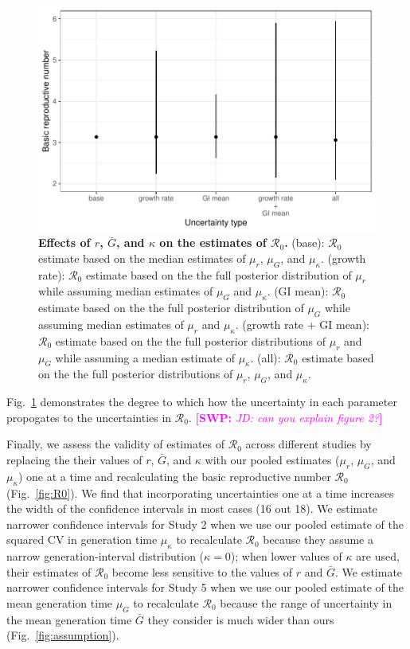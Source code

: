 \documentclass[12pt]{article}
\newcommand{\fref}[1]{Fig.~\ref{fig:#1}}
\newcommand{\comment}[3]{\textcolor{#1}{\textbf{[#2: }\textsl{#3}\textbf{]}}}
\newcommand{\swp}[1]{\comment{magenta}{SWP}{#1}}
\begin{document}
\begin{figure}[!ht]
\includegraphics[width=\textwidth]{figure2.pdf}
\caption{
\textbf{Effects of $r$, $\bar G$, and $\kappa$ on the estimates of $\mathcal R_0$.}
(base): $\mathcal R_0$ estimate based on the median estimates of $\mu_r$, $\mu_G$, and $\mu_\kappa$.
(growth rate): $\mathcal R_0$ estimate based on the the full posterior distribution of $\mu_r$ while assuming median estimates of $\mu_G$ and $\mu_\kappa$.
(GI mean): $\mathcal R_0$ estimate based on the the full posterior distribution of $\mu_G$ while assuming median estimates of $\mu_r$ and $\mu_\kappa$.
(growth rate + GI mean): $\mathcal R_0$ estimate based on the the full posterior distributions of $\mu_r$ and $\mu_G$ while assuming a median estimate of $\mu_\kappa$.
(all): $\mathcal R_0$ estimate based on the the full posterior distributions of  $\mu_r$, $\mu_G$, and $\mu_\kappa$.
}
\label{fig:eff}
\end{figure}

\fref{eff} demonstrates the degree to which how the uncertainty in each parameter propogates to the uncertainties in $\mathcal R_0$.
\swp{JD: can you explain figure 2?}

Finally, we assess the validity of estimates of $\mathcal R_0$ across different studies by 
replacing the their values of $r$, $\bar G$, and $\kappa$ with our pooled estimates ($\mu_r$, $\mu_G$, and $\mu_\kappa$) one at a time and recalculating the basic reproductive number $\mathcal R_0$ (\fref{R0}).
We find that incorporating uncertainties one at a time increases the width of the confidence intervals in most cases (16 out 18).
We estimate narrower confidence intervals for Study 2 when we use our pooled estimate of the squared CV in generation time $\mu_\kappa$ to recalculate $\mathcal R_0$ because they assume a narrow generation-interval distribution ($\kappa=0$);
when lower values of $\kappa$ are used, their estimates of $\mathcal R_0$ become less sensitive to the values of $r$ and $\bar G$.
We estimate narrower confidence intervals for Study 5 when we use our pooled estimate of the mean generation time $\mu_G$ to recalculate $\mathcal R_0$ because the range of uncertainty in the mean generation time $\bar G$ they consider is much wider than ours (\fref{assumption}).
\end{document}

